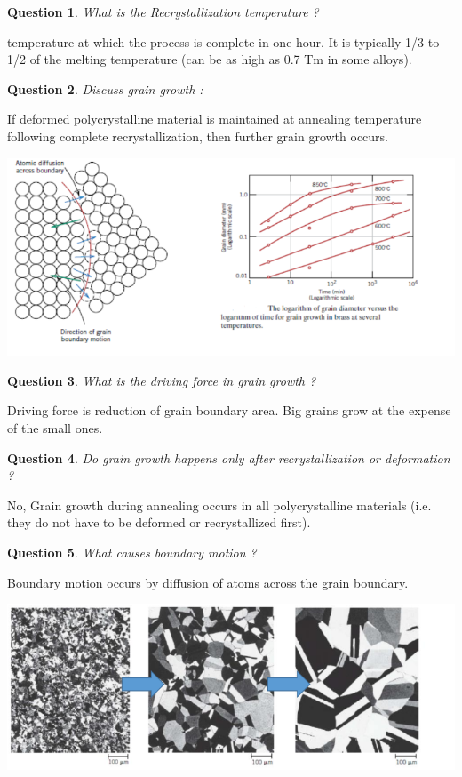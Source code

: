\documentclass[13]{article}
\newtheorem{exer}{Question}
\begin{document}
\begin{exer}
What is the Recrystallization temperature ?
\end{exer}
temperature at which the process is
complete in one hour. It is typically 1/3 to 1/2 of the melting temperature
(can be as high as 0.7 Tm in some alloys).
\begin{exer}
Discuss grain growth :
\end{exer}
If deformed polycrystalline material is maintained at annealing temperature
following complete recrystallization, then further grain growth occurs.
\begin{center}
\includegraphics[scale=0.5]{figures/25.png}
\end{center}
\begin{exer}
What is the driving force in grain growth ?
\end{exer}
Driving force is reduction of grain boundary area. Big grains grow at the expense of the small ones.
\begin{exer}
Do grain growth happens only after recrystallization or deformation ?
\end{exer}
No, Grain growth during annealing occurs in all polycrystalline materials (i.e. they do not have to be deformed or recrystallized first). 
\begin{exer}
What causes boundary motion ?
\end{exer}
Boundary motion occurs by diffusion of atoms across the grain boundary.
\begin{center}
\includegraphics[scale=0.5]{figures/26.png}
\end{center}
\end{document}
